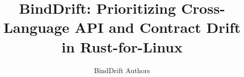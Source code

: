 \documentclass[conference]{IEEEtran}
\title{BindDrift: Prioritizing Cross-Language API and Contract Drift in Rust-for-Linux}
\author{BindDrift Authors}
\begin{document}
\maketitle

\begin{abstract}

\end{abstract}













\end{document}
